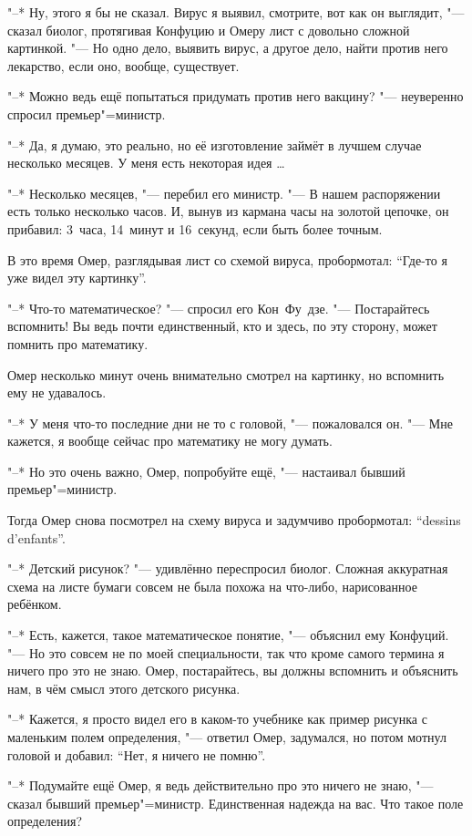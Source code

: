 "--* Ну, этого я бы не сказал.
Вирус я выявил, смотрите, вот как он выглядит, "--- сказал биолог, протягивая
Конфуцию и Омеру лист с довольно сложной картинкой.
"--- Но одно дело, выявить вирус, а другое дело, найти против него лекарство,
если оно, вообще, существует.

"--* Можно ведь ещё попытаться придумать против него вакцину? "--- неуверенно
спросил премьер"=министр.

"--* Да, я думаю, это реально, но её изготовление займёт в лучшем случае
несколько месяцев.
У меня есть некоторая идея \ldots

"--* Несколько месяцев, "--- перебил его министр.
"--- В нашем распоряжении есть только несколько часов.
И, вынув из кармана часы на золотой цепочке, он прибавил: 3~часа, 14~минут и
16~секунд, если быть более точным.

В это время Омер, разглядывая лист со схемой вируса, пробормотал:
\enquote{Где-то я уже видел эту картинку}.

"--* Что-то математическое? "--- спросил его Кон~Фу~дзе.
"--- Постарайтесь вспомнить!
Вы ведь почти единственный, кто и здесь, по эту сторону, может помнить про
математику.

Омер несколько минут очень внимательно смотрел на картинку, но вспомнить ему не
удавалось.

"--* У меня что-то последние дни не то с головой, "--- пожаловался он.
"--- Мне кажется, я вообще сейчас про математику не могу думать.

"--* Но это очень важно, Омер, попробуйте ещё, "--- настаивал бывший
премьер"=министр.

Тогда Омер снова посмотрел на схему вируса и задумчиво пробормотал:
\enquote{\foreignlanguage{french}{dessins d'enfants}}.

"--* Детский рисунок? "--- удивлённо переспросил биолог.
Сложная аккуратная схема на листе бумаги совсем не была похожа на что-либо,
нарисованное ребёнком.

"--* Есть, кажется, такое математическое понятие, "--- объяснил ему Конфуций.
"--- Но это совсем не по моей специальности, так что кроме самого термина я
ничего про это не знаю.
Омер, постарайтесь, вы должны вспомнить и объяснить нам, в чём смысл этого
детского рисунка.

"--* Кажется, я просто видел его в каком-то учебнике как пример рисунка с
маленьким полем определения, "--- ответил Омер, задумался, но потом мотнул
головой и добавил: \enquote{Нет, я ничего не помню}.

"--* Подумайте ещё Омер, я ведь действительно про это ничего не знаю, "---
сказал бывший премьер"=министр.
Единственная надежда на вас.
Что такое поле определения?

